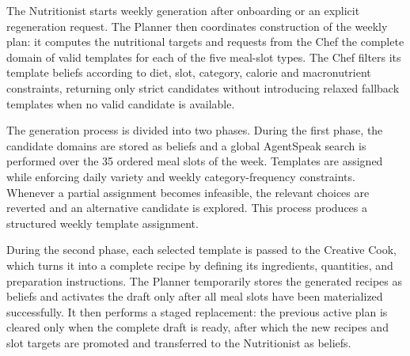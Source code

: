 \documentclass[12pt,a4paper]{article}
\begin{document}
The Nutritionist starts weekly generation after onboarding or an explicit regeneration request. The
Planner then coordinates construction of the weekly plan: it computes the nutritional targets and
requests from the Chef the complete domain of valid
templates for each of the five meal-slot types. The Chef filters its template
beliefs according to diet, slot, category, calorie and macronutrient constraints, returning
only strict candidates without introducing relaxed fallback templates when no
valid candidate is available.

The generation process is divided into two phases. During the first phase, the
candidate domains are stored as beliefs and a global AgentSpeak search is
performed over the 35 ordered meal slots of the week. Templates are assigned
while enforcing daily variety and weekly category-frequency constraints. Whenever a partial assignment becomes
infeasible, the relevant choices are reverted and an alternative candidate is
explored. This process produces a structured weekly template assignment.

During the second phase, each selected template is passed to the Creative Cook,
which turns it into a complete recipe by defining its ingredients, quantities,
and preparation instructions. The Planner temporarily stores the generated
recipes as beliefs and activates the draft only after all meal slots have been
materialized successfully. It then performs a staged replacement: the previous
active plan is cleared only when the complete draft is ready, after which the new
recipes and slot targets are promoted and transferred to the Nutritionist as beliefs.
\end{document}
